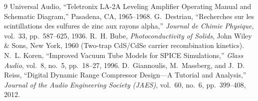 \documentclass[11pt,a4paper]{article}
\begin{document}
\vspace{1.0em}
\begin{thebibliography}{9}
Universal Audio, ``Teletronix LA-2A Leveling Amplifier Operating Manual and Schematic Diagram,'' Pasadena, CA, 1965--1968.
G.~Destriau, ``Recherches sur les scintillations des sulfures de zinc aux rayons alpha,'' \emph{Journal de Chimie Physique}, vol.~33, pp.~587--625, 1936.
R.~H. Bube, \emph{Photoconductivity of Solids}, John Wiley \& Sons, New York, 1960 (Two-trap CdS/CdSe carrier recombination kinetics).
N.~L. Koren, ``Improved Vacuum Tube Models for SPICE Simulations,'' \emph{Glass Audio}, vol.~8, no.~5, pp.~18--27, 1996.
D.~Giannoulis, M.~Massberg, and J.~D. Reiss, ``Digital Dynamic Range Compressor Design---A Tutorial and Analysis,'' \emph{Journal of the Audio Engineering Society (JAES)}, vol.~60, no.~6, pp.~399--408, 2012.
\end{thebibliography}
\end{document}
